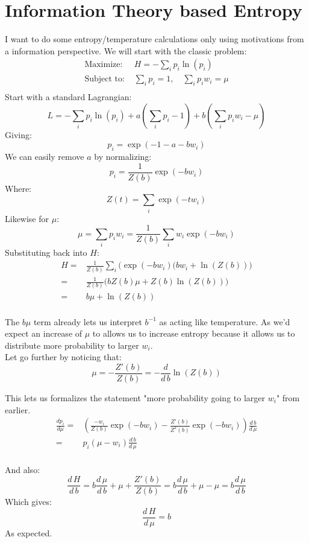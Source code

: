 
\section{Information Theory based Entropy}
I want to do some entropy/temperature calculations only using motivations from a information perspective.
We will start with the classic problem:
\begin{equation*}
\begin{aligned}
	\text{Maximize: }& H=-\sum_i p_i\ln(p_i)\\
	\text{Subject to: }& \sum_ip_i=1,\quad \sum_ip_iw_i = \mu \\
\end{aligned}
\end{equation*}
Start with a standard Lagrangian:
\[ L = -\sum_ip_i\ln(p_i)+a\left(\sum_i p_i - 1\right) + b\left(\sum_i p_iw_i - \mu\right)\]
Giving:
\[p_i = \exp(-1-a-bw_i)\]
We can easily remove $a$ by normalizing:
\[p_i = \frac{1}{Z(b)}\exp(-bw_i)\]
Where:
\[Z(t) = \sum_i \exp(-tw_i)\]
Likewise for $\mu$:
\[\mu = \sum_ip_iw_i = \frac{1}{Z(b)}\sum_iw_i\exp(-bw_i)\]
Substituting back into $H$:
\begin{equation*}
\begin{aligned}
	H =& \frac{1}{Z(b)}\sum_i\bigg(\exp(-bw_i)(bw_i+\ln(Z(b))\bigg)\\
	=& \frac{1}{Z(b)}\bigg(bZ(b)\mu+Z(b)\ln(Z(b))\bigg)\\
	=& b\mu+\ln(Z(b))\\
\end{aligned}
\end{equation*}

The $b\mu$ term already lets us interpret $b^{-1}$ as acting like temperature.
As we'd expect an increase of $\mu$ to allows us to increase entropy because it allows us to distribute more probability to larger $w_i$.
\\

Let go further by noticing that:
\[\mu = - \frac{Z'(b)}{Z(b)} = -\frac{d}{d\,b}\ln(Z(b))\]

This lets us formalizes the statement "more probability going to larger $w_i$" from earlier.
\begin{equation*}
\begin{aligned}
	\frac{d p_i}{d \mu} =& \left(\frac{-w_i}{Z(b)}\exp(-bw_i)-\frac{Z'(b)}{Z^2(b)}\exp(-bw_i)\right)\frac{d\,b}{d\,\mu}\\
	=&p_i(\mu-w_i)\frac{d\,b}{d\,\mu}\\
\end{aligned}
\end{equation*}

And also:
\[\frac{d\,H}{d\,b} = b\frac{d\,\mu}{d\,b}+\mu+\frac{Z'(b)}{Z(b)} = b\frac{d\,\mu}{d\,b}+\mu -\mu =b\frac{d\,\mu}{d\,b}\]
Which gives:
\[\frac{d\, H}{d\, \mu} = b\]
As expected.
